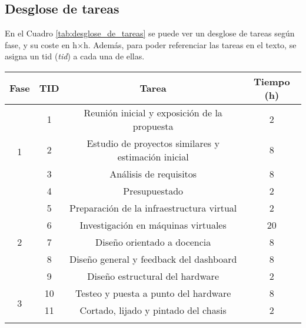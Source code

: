 \subsection{Desglose de tareas}
En el Cuadro \ref{tab:desglose_de_tareas} se puede ver un desglose de tareas según fase, y su coste en h$\times$h. Además, para poder referenciar las tareas en el texto, se asigna un \acrshort{tid} (\textit{\acrlong{tid}}) a cada una de ellas. 
\begin{table}[htpb]
  \centering
  \begin{tabular}{ |c|c|c|c| }
  \hline
  \textbf{Fase} & \textbf{TID} & \textbf{Tarea} & \textbf{Tiempo (h)} \\ 
  \hline
  \multirow{4}{*}{1}        & 1     & {Reunión inicial y exposición de la propuesta}                            & 2 \\\cline{2-4}
                            & 2     & {Estudio de proyectos similares y estimación inicial}                     & 8 \\\cline{2-4}
                            & 3     & {Análisis de requisitos}                                                  & 8 \\\cline{2-4}
                            & 4     & {Presupuestado}                                                           & 2 \\
  \hline
  \multirow{5}{*}{2}        & 5     & {Preparación de la infraestructura virtual}                               & 2 \\\cline{2-4}
                            & 6     & {Investigación en máquinas virtuales}                                     & 20 \\\cline{2-4}
                            & 7     & {Diseño orientado a docencia}                                             & 8 \\\cline{2-4}
                            & 8     & {Diseño general y feedback del dashboard}                                 & 8 \\\cline{2-4}
                            & 9     & {Diseño estructural del hardware}                                         & 2 \\
  \hline
  \multirow{5}{*}{3}        & 10    & {Testeo y puesta a punto del hardware}                                    & 8 \\\cline{2-4}
                            & 11    & {Cortado, lijado y pintado del chasis}                                    & 2 \\\cline{2-4}

\end{tabular}
\end{table}
